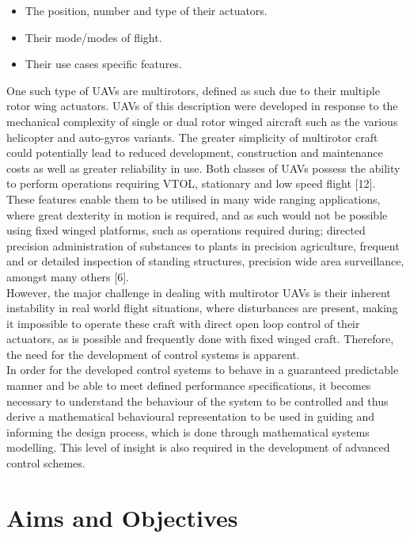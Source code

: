 \documentclass[12pt,a4paper,twoside]{report}
\begin{document}
			\begin{itemize}
				\item
					The position, number and type of their actuators.
				\item 
					Their mode/modes of flight. 
				\item 
					Their use cases specific features.
			\end{itemize}
			\space
			One such type of UAVs are multirotors, defined as such due to their multiple rotor wing actuators. UAVs of this description were developed in response to the mechanical complexity of single or dual rotor winged aircraft such as the various helicopter and auto-gyros variants. The greater simplicity of multirotor craft could potentially lead to reduced development, construction and maintenance costs as well as greater reliability in use. Both classes of UAVs possess the ability to perform operations requiring VTOL, stationary and low speed flight [12].
			\\
			These features enable them to be utilised in many wide ranging applications, where great dexterity in motion is required, and as such would not be possible using fixed winged platforms, such as operations required during; directed precision administration of substances to plants in precision agriculture, frequent and or detailed inspection of standing structures, precision wide area surveillance, amongst many others [6].
			\\
			However, the major challenge in dealing with multirotor UAVs is their inherent instability in real world flight situations, where disturbances are present, making it impossible to operate these craft with direct open loop control of their actuators, as is possible and frequently done with fixed winged craft. Therefore, the need for the development of control systems is apparent. 
			\\
			In order for the developed control systems to behave in a guaranteed predictable manner and be able to meet defined performance specifications, it becomes necessary to understand the behaviour of the system to be controlled and thus derive a mathematical behavioural representation to be used in guiding and informing the design process, which is done through mathematical systems modelling. This level of insight is also required in the development of advanced control schemes.
		
		
		\section{Aims and Objectives}
			
\end{document}
